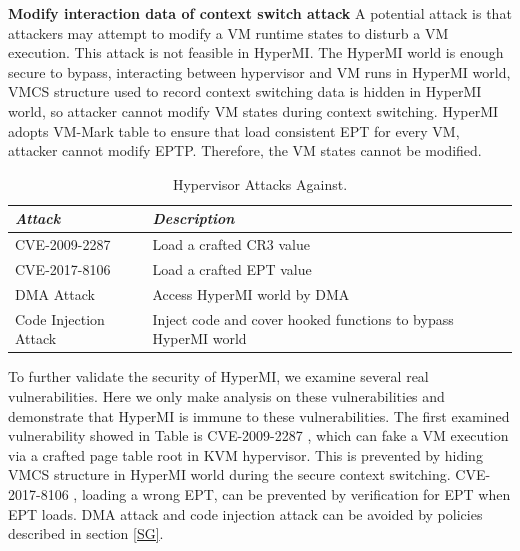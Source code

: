 \documentclass[conference]{IEEEtran}
\begin{document}

\textbf{Modify interaction data of context switch attack}
A potential attack is that attackers may attempt to modify a VM runtime states to disturb a VM execution. This attack is not feasible in HyperMI. The HyperMI world is enough secure to bypass, interacting between hypervisor and VM runs in HyperMI world, VMCS structure used to record context switching data is hidden in HyperMI world, so attacker cannot modify VM states during context switching. HyperMI adopts VM-Mark table to ensure that load consistent EPT for every VM, attacker cannot modify EPTP. Therefore, the VM states cannot be modified.
\begin{table}
\centering
\caption{Hypervisor Attacks Against.}\label{tab3}
\begin{tabular}{p{2.4cm}|p{5.5cm}}
\hline
{\itshape\bfseries Attack} & {\itshape\bfseries Description} \\
\hline
CVE-2009-2287 & Load a crafted CR3 value\\
\hline
CVE-2017-8106 & Load a crafted EPT value \\
\hline
DMA Attack & Access HyperMI world by DMA \\
\hline
Code Injection Attack & Inject code and cover hooked functions to bypass HyperMI world \\
\hline
\end{tabular}
\end{table}
To further validate the security of HyperMI, we examine several real vulnerabilities. Here we only make analysis on these vulnerabilities and demonstrate that HyperMI is immune to these vulnerabilities. The first examined vulnerability showed in Table \cite{tab3} is CVE-2009-2287 \cite{cve2009}, which can fake a VM execution via a crafted page table root in KVM hypervisor. This is prevented by hiding VMCS structure in HyperMI world during the secure context switching. CVE-2017-8106 \cite{cve2017}, loading a wrong EPT, can be prevented by verification for EPT when EPT loads. DMA attack and code injection attack can be avoided by policies described in section \ref{SG}.
\end{document}
